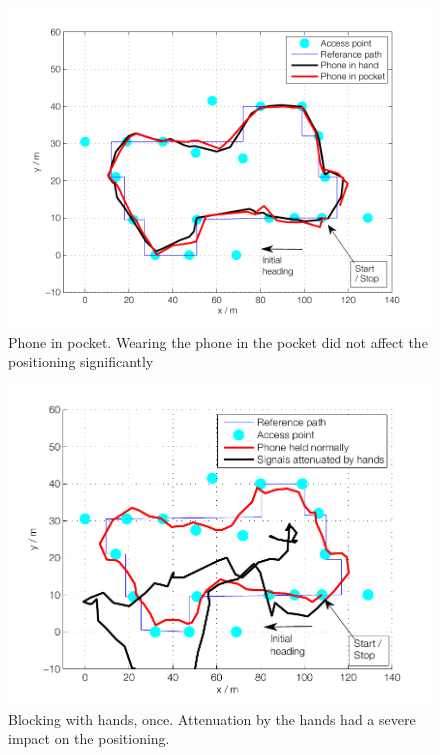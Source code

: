 \documentclass{LTHthesis}
\begin{document}
\begin{figure}

\includegraphics[width=1\textwidth ]{images/adapt_parameters/positioning_pocket}
\caption{Phone in pocket. Wearing the phone in the pocket did not affect the positioning significantly}\label{positioning_pocket}
\end{figure}

\begin{figure}

\includegraphics[width=1\textwidth ]{images/adapt_parameters/hand_block}
\caption{Blocking with hands, once. Attenuation by the hands had a severe impact on the positioning.}\label{hand_block}
\end{figure}
\end{document}
